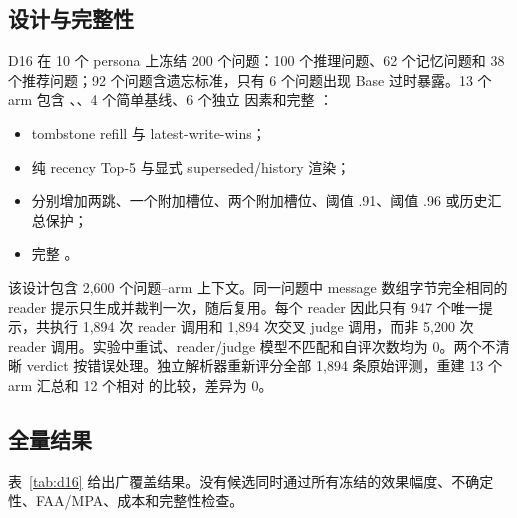 \subsection{设计与完整性}

D16 在 10 个 persona 上冻结 200 个问题：100 个推理问题、62 个记忆问题和 38 个推荐问题；92 个问题含遗忘标准，只有 6 个问题出现 Base 过时暴露。13 个 arm 包含 \base、\vone、4 个简单基线、6 个独立 \vtwo 因素和完整 \vtwo：
\begin{itemize}
  \item tombstone refill 与 latest-write-wins；
  \item 纯 recency Top-5 与显式 superseded/history 渲染；
  \item \vone 分别增加两跳、一个附加槽位、两个附加槽位、阈值 .91、阈值 .96 或历史汇总保护；
  \item 完整 \vtwo。
\end{itemize}

该设计包含 2,600 个问题--arm 上下文。同一问题中 message 数组字节完全相同的 reader 提示只生成并裁判一次，随后复用。每个 reader 因此只有 947 个唯一提示，共执行 1,894 次 reader 调用和 1,894 次交叉 judge 调用，而非 5,200 次 reader 调用。实验中重试、reader/judge 模型不匹配和自评次数均为 0。两个不清晰 verdict 按错误处理。独立解析器重新评分全部 1,894 条原始评测，重建 13 个 arm 汇总和 12 个相对 \vone 的比较，差异为 0。

\subsection{全量结果}

表~\ref{tab:d16} 给出广覆盖结果。没有候选同时通过所有冻结的效果幅度、不确定性、FAA/MPA、成本和完整性检查。

